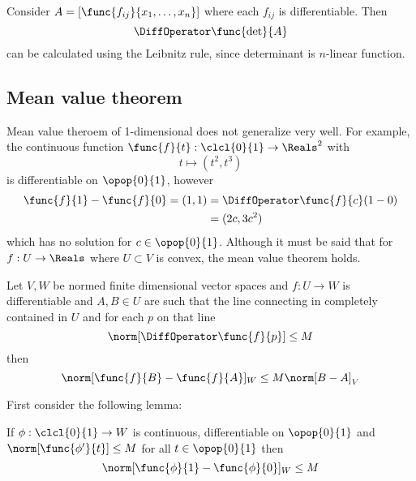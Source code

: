 \begin{example}
    Consider \(A = [\func{f_{ij}}{x_1, \dots , x_n}]\) where each \(f_{ij}\) is differentiable. Then
    \begin{equation*}
        \DiffOperator \func{\det}{A}
    \end{equation*}
    can be calculated using the Leibnitz rule, since determinant is \(n\)-linear function.
\end{example}

\subsection{Mean value theorem}
Mean value theroem of 1-dimensional does not generalize very well. For example, the continuous function \(\func{f}{t} : \clcl{0}{1} \to \Reals^2\) with
\begin{equation*}
    t \mapsto (t^2, t^3)
\end{equation*}
is differentiable on \(\opop{0}{1}\), however
\begin{align*}
    \func{f}{1} - \func{f}{0} = (1,1) & = \DiffOperator \func{f}{c} (1 - 0) \\
                                      & = (2c,3c^2)
\end{align*}
which has no solution for \(c \in \opop{0}{1}\).
Although it must be said that for \(f: U \to \Reals\) where \(U \subset V\) is convex, the mean value theorem holds.

\begin{theorem} \label{th:MultivariableMVT}
    Let \(V,W\) be normed finite dimensional vector spaces and \(f: U \to W\) is differentiable and \(A,B \in U\) are such that the line connecting in completely contained in \(U\) and for each \(p\) on that line
    \begin{equation*}
        \norm[\DiffOperator \func{f}{p}] \leq M
    \end{equation*}
    then
    \begin{equation*}
        \norm[\func{f}{B} - \func{f}{A}]_W \leq M \norm[B - A]_V
    \end{equation*}
\end{theorem}
First consider the following lemma:
\begin{lemma} \label{lm:MeanValueTheoremLemma}
    If \(\phi: \clcl{0}{1} \to W\) is continuous, differentiable on \(\opop{0}{1}\) and \(\norm[\func{\phi'}{t}] \leq M\) for all \(t \in \opop{0}{1}\) then
    \begin{equation*}
        \norm[\func{\phi}{1} - \func{\phi}{0}]_W \leq M
    \end{equation*}
\end{lemma}

